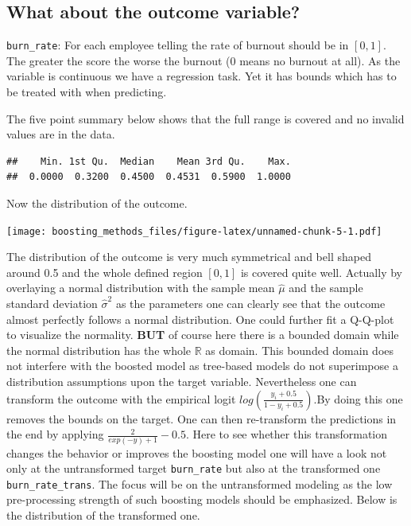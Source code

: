 \documentclass[
]{book}
\begin{document}
\hypertarget{what-about-the-outcome-variable}{%
\subsection{What about the outcome variable?}\label{what-about-the-outcome-variable}}

\texttt{burn\_rate}: For each employee telling the rate of burnout should be in \([0,1]\). The greater the score the worse the burnout (0 means no burnout at all). As the variable is continuous we have a regression task. Yet it has bounds which has to be treated with when predicting.

The five point summary below shows that the full range is covered and no invalid values are in the data.

\begin{verbatim}
##    Min. 1st Qu.  Median    Mean 3rd Qu.    Max. 
##  0.0000  0.3200  0.4500  0.4531  0.5900  1.0000
\end{verbatim}

Now the distribution of the outcome.

\texttt{[image: boosting\_methods\_files/figure-latex/unnamed-chunk-5-1.pdf]}

The distribution of the outcome is very much symmetrical and bell shaped around 0.5 and the whole defined region \([0,1]\) is covered quite well. Actually by overlaying a normal distribution with the sample mean \(\hat{\mu}\) and the sample standard deviation \(\hat{\sigma}^2\) as the parameters one can clearly see that the outcome almost perfectly follows a normal distribution. One could further fit a Q-Q-plot to visualize the normality. \textbf{BUT} of course here there is a bounded domain while the normal distribution has the whole \(\mathbb{R}\) as domain. This bounded domain does not interfere with the boosted model as tree-based models do not superimpose a distribution assumptions upon the target variable. Nevertheless one can transform the outcome with the empirical logit \(log(\frac{y_i+0.5}{1-y_i+0.5})\).By doing this one removes the bounds on the target. One can then re-transform the predictions in the end by applying \(\frac{2}{exp(-y)+1}-0.5\). Here to see whether this transformation changes the behavior or improves the boosting model
one will have a look not only at the untransformed target \texttt{burn\_rate} but also at the transformed one \texttt{burn\_rate\_trans}. The focus will be on the untransformed modeling as the low pre-processing strength of such boosting models should be emphasized. Below is the distribution of the transformed one.
\end{document}
